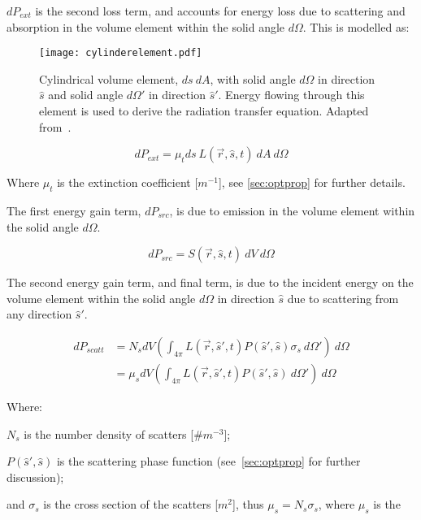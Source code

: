 $dP_{ext}$ is the second loss term, and accounts for energy loss due to scattering and absorption in the volume element within the solid angle $d\Omega$. This is modelled as:

\begin{figure}[!htb]
	\centering
	\texttt{[image: cylinderelement.pdf]}
	\caption{Cylindrical volume element, $ds\ dA$, with solid angle $d\Omega$ in direction $\hat{s}$ and solid angle $d\Omega'$ in direction $\hat{s}'$. Energy flowing through this element is used to derive the radiation transfer equation. Adapted from~\cite{wang2012biomedical,chandrasekhar2013radiative}.}
	\label{fig:energydiag2}
\end{figure}

\begin{equation}
	dP_{ext}=\mu_t ds\ L(\vec{r},\hat{s},t)\ dA\ d\Omega
	\label{eqn:pext}
\end{equation}

Where $\mu_t$ is the extinction coefficient [$m^{-1}$], see \cref{sec:optprop} for further details.

The first energy gain term, $dP_{src}$, is due to emission in the volume element within the solid angle $d\Omega$. 

\begin{equation}
	dP_{src}=S(\vec{r},\hat{s},t)\ dV\ d\Omega
	\label{eqn:psrc}
\end{equation}

The second energy gain term, and final term, is due to the incident energy on the volume element within the solid angle $d\Omega$ in direction $\hat{s}$ due to scattering from any direction $\hat{s}'$.

\begin{align}
	dP_{scatt}&=N_sdV\left(\int_{4\pi}L(\vec{r},\hat{s}',t)P(\hat{s}',\hat{s})\sigma_s\ d\Omega' \right)\ d\Omega \\
			  &=\mu_sdV\left(\int_{4\pi}L(\vec{r},\hat{s}',t)P(\hat{s}',\hat{s})\ d\Omega' \right)\ d\Omega 
			  \label{eqn:pscatt}
\end{align}

\noindent Where:

\indent $N_s$ is the number density of scatters [$\#m^{-3}$];

\indent $P(\hat{s}',\hat{s})$ is the scattering phase function (see~\cref{sec:optprop} for further discussion);

\indent and $\sigma_s$ is the cross section of the scatters [$m^2$], thus $\mu_s=N_s\sigma_s$, where $\mu_s$ is the 

